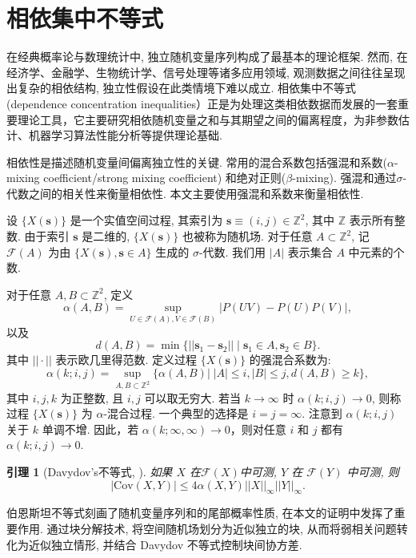 \documentclass[a4paper,openay,14pt]{ctexbook}
\numberwithin{equation}{section}
\numberwithin{lem}{section}
\newtheorem{lemma}[theorem]{引理}%
\begin{document}
\section{相依集中不等式}
在经典概率论与数理统计中, 独立随机变量序列构成了最基本的理论框架. 然而, 在经济学、金融学、生物统计学、信号处理等诸多应用领域, 观测数据之间往往呈现出复杂的相依结构, 独立性假设在此类情境下难以成立. 相依集中不等式(dependence concentration inequalities）正是为处理这类相依数据而发展的一套重要理论工具，它主要研究相依随机变量之和与其期望之间的偏离程度，为非参数估计、机器学习算法性能分析等提供理论基础.

相依性是描述随机变量间偏离独立性的关键. 常用的混合系数包括强混和系数($\alpha$-mixing coefficient/strong mixing coefficient) 和绝对正则($\beta$-mixing). 强混和通过$\sigma$-代数之间的相关性来衡量相依性. 本文主要使用强混和系数来衡量相依性.

设 $\{X(\mathbf{s})\}$ 是一个实值空间过程, 其索引为 $\mathbf{s} \equiv (i, j) \in \mathbb{Z}^2$, 其中 $\mathbb{Z}$ 表示所有整数. 由于索引 $\mathbf{s}$ 是二维的, $\{X(\mathbf{s})\}$ 也被称为随机场. 对于任意 $A \subset \mathbb{Z}^2$, 记 $\mathcal{F}(A)$ 为由 $\{X(\mathbf{s}), \mathbf{s} \in A\}$ 生成的 $\sigma$-代数. 我们用 $|A|$ 表示集合 $A$ 中元素的个数.

对于任意 $A, B \subset \mathbb{Z}^2$, 定义
\[
\alpha(A, B) = \sup_{U \in \mathcal{F}(A), V \in \mathcal{F}(B)} \big|P(UV) - P(U)P(V)\big|,
\]
以及
\[
d(A, B) = \min \{||\mathbf{s}_1 - \mathbf{s}_2|| \mid \mathbf{s}_1 \in A, \mathbf{s}_2 \in B\}.
\]
其中 $||\cdot||$ 表示欧几里得范数. 定义过程 $\{X(\mathbf{s})\}$ 的强混合系数为:
\[
\alpha(k; i, j) = \sup_{A,B \subset \mathbb{Z}^2} \{  \alpha(A, B)| \; |A| \leq i, |B| \leq j, d(A,B) \geq k\}, 
\]
其中 $i, j, k$ 为正整数, 且 $i, j$ 可以取无穷大. 若当 $k \to \infty$ 时 $\alpha(k; i, j) \to 0$, 则称过程 $\{X(\mathbf{s})\}$ 为 $\alpha$-混合过程. 一个典型的选择是 $i = j = \infty$. 注意到 $\alpha(k; i, j)$ 关于 $k$ 单调不增. 因此，若 $\alpha(k; \infty, \infty) \to 0$，则对任意 $i$ 和 $j$ 都有 $\alpha(k; i, j) \to 0$.


\begin{lemma}[Davydov's不等式, \cite{fazekas2003limit}]
如果 $X$ 在$\mathcal{F}(X)$中可测, $Y$ 在 $\mathcal{F}(Y)$ 中可测, 则
\[
| \mathrm{Cov} (X, Y)| \leq 4\alpha(X, Y)||X||_{\infty}||Y||_{\infty}.
\]
\end{lemma}

伯恩斯坦不等式刻画了随机变量序列和的尾部概率性质, 在本文的证明中发挥了重要作用. 通过块分解技术, 将空间随机场划分为近似独立的块, 从而将弱相关问题转化为近似独立情形, 并结合 Davydov 不等式控制块间协方差.
\end{document}
